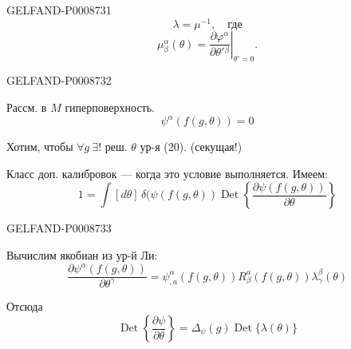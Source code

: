 \begin{GelfandAdjacentEvidence}{GELFAND-P000873}{1}
\begin{equation*}
\lambda=\mu^{-1},\quad\text{где}
\tag{19}
\end{equation*}
\begin{equation*}
\mu_\beta^\alpha(\theta)=\left.\frac{\partial\varphi^\alpha}{\partial\theta'{}^\beta}\right|_{\theta'=0}.
\tag*{\((19)'\)}
\end{equation*}
\end{GelfandAdjacentEvidence}
\begin{GelfandAdjacentEvidence}{GELFAND-P000873}{2}


Рассм. в $M$ гиперповерхность.
\begin{equation*}
\psi^\alpha(f(g,\theta))=0
\tag{20}
\end{equation*}

Хотим, чтобы $\forall g\ \exists!$ реш. $\theta$ ур-я (20). (секущая!)

Класс доп. калибровок --- когда это условие выполняется. Имеем:
\begin{equation*}
1=\int[d\theta]\,\delta(\psi(f(g,\theta))\operatorname{Det}
\left\{\frac{\partial\psi(f(g,\theta))}{\partial\theta}\right\}
\tag{21}
\end{equation*}
\end{GelfandAdjacentEvidence}
\begin{GelfandAdjacentEvidence}{GELFAND-P000873}{3}


Вычислим якобиан из ур-й Ли:
\begin{equation*}
\frac{\partial\psi^\alpha(f(g,\theta))}{\partial\theta^\gamma}
=\psi^\alpha_{,a}(f(g,\theta))R_\beta^a(f(g,\theta))\lambda_\gamma^\beta(\theta)
\tag{22}
\end{equation*}

Отсюда
\begin{equation*}
\operatorname{Det}\left\{\frac{\partial\psi}{\partial\theta}\right\}
=\Delta_\psi(g)\operatorname{Det}\{\lambda(\theta)\}
\tag{23}
\end{equation*}
\end{GelfandAdjacentEvidence}
